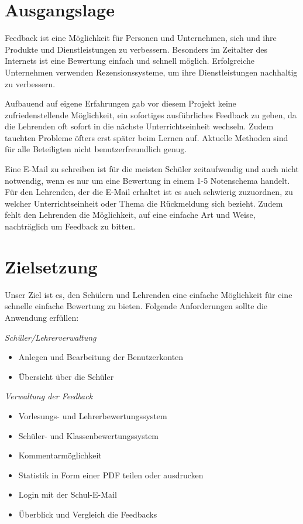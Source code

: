 \section{Ausgangslage}
Feedback ist eine Möglichkeit für Personen und Unternehmen, sich und ihre Produkte und Dienstleistungen zu verbessern. 
Besonders im Zeitalter des Internets ist eine Bewertung einfach und schnell möglich. 
Erfolgreiche Unternehmen verwenden Rezensionssysteme, um ihre Dienstleistungen nachhaltig zu verbessern. 

Aufbauend auf eigene Erfahrungen gab vor diesem Projekt keine zufriedenstellende Möglichkeit, ein sofortiges ausführliches Feedback zu geben, 
da die Lehrenden oft sofort in die nächste Unterrichtseinheit wechseln. Zudem tauchten Probleme öfters erst später beim Lernen auf. 
Aktuelle Methoden sind für alle Beteiligten nicht benutzerfreundlich genug.

Eine E-Mail zu schreiben ist für die meisten Schüler zeitaufwendig und auch nicht notwendig, wenn es nur um eine Bewertung in einem 1-5 Notenschema handelt. 
Für den Lehrenden, der die E-Mail erhaltet ist es auch schwierig zuzuordnen, 
zu welcher Unterrichtseinheit oder Thema die Rückmeldung sich bezieht. Zudem fehlt den Lehrenden die Möglichkeit, auf eine einfache 
Art und Weise, nachträglich um Feedback zu bitten.

\section{Zielsetzung}
Unser Ziel ist es, den Schülern und Lehrenden eine einfache Möglichkeit für eine schnelle einfache Bewertung zu bieten.
Folgende Anforderungen sollte die Anwendung erfüllen:

\textit{Schüler/Lehrerverwaltung}
\begin{itemize}
    \item Anlegen und Bearbeitung der Benutzerkonten
    \item Übersicht über die Schüler
\end{itemize}

\textit{Verwaltung der Feedback}
\begin{itemize}
    \item Vorlesungs- und Lehrerbewertungssystem
    \item Schüler- und Klassenbewertungssystem
    \item Kommentarmöglichkeit
    \item Statistik in Form einer PDF teilen oder ausdrucken
    \item Login mit der Schul-E-Mail
    \item Überblick und Vergleich die Feedbacks
\end{itemize}

